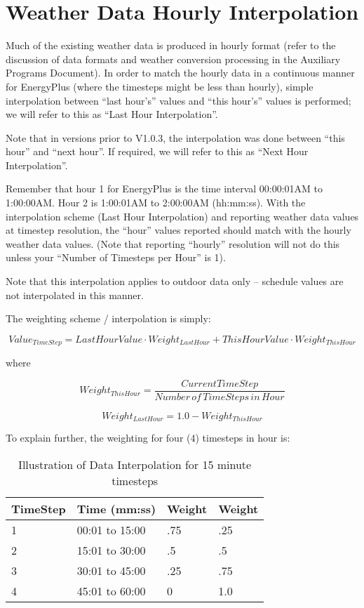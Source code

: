 \section{Weather Data Hourly Interpolation}\label{weather-data-hourly-interpolation}

Much of the existing weather data is produced in hourly format (refer to the discussion of data formats and weather conversion processing in the Auxiliary Programs Document). In order to match the hourly data in a continuous manner for EnergyPlus (where the timesteps might be less than hourly), simple interpolation between ``last hour's'' values and ``this hour's'' values is performed; we will refer to this as ``Last Hour Interpolation''.

Note that in versions prior to V1.0.3, the interpolation was done between ``this hour'' and ``next hour''. If required, we will refer to this as ``Next Hour Interpolation''.

Remember that hour 1 for EnergyPlus is the time interval 00:00:01AM to 1:00:00AM. Hour 2 is 1:00:01AM to 2:00:00AM (hh:mm:ss). With the interpolation scheme (Last Hour Interpolation) and reporting weather data values at timestep resolution, the ``hour'' values reported should match with the hourly weather data values. (Note that reporting ``hourly'' resolution will not do this unless your ``Number of Timesteps per Hour'' is 1).

Note that this interpolation applies to outdoor data only -- schedule values are not interpolated in this manner.

The weighting scheme / interpolation is simply:

\begin{equation}
Valu{e_{TimeStep}} = LastHourValue\cdot Weigh{t_{LastHour}} + ThisHourValue\cdot Weigh{t_{ThisHour}}
\end{equation}

where

\begin{equation}
Weigh{t_{ThisHour}} = \frac{{CurrentTimeStep}}{{Number\,of\,TimeSteps\,in\,Hour}}
\end{equation}

\begin{equation}
Weigh{t_{LastHour}} = 1.0 - Weigh{t_{ThisHour}}
\end{equation}

To explain further, the weighting for four (4) timesteps in hour is:

\begin{longtable}[c]{@{}llll@{}}
\caption{Illustration of Data Interpolation for 15 minute timesteps \protect \label{table:illustration-of-data-interpolation-for-15}}\\
\toprule 
TimeStep & Time (mm:ss) & Weight & Weight \tabularnewline \midrule
\endhead
1 & 00:01 to 15:00 & .75 & .25 \tabularnewline
2 & 15:01 to 30:00 & .5 & .5 \tabularnewline
3 & 30:01 to 45:00 & .25 & .75 \tabularnewline
4 & 45:01 to 60:00 & 0 & 1.0 \tabularnewline
\bottomrule
\end{longtable}


